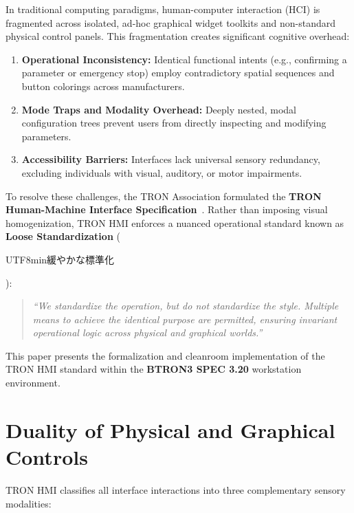 \documentclass[10pt,journal,compsoc,twocolumn]{article}
\newcommand{\ja}[1]{\begin{CJK*}{UTF8}{min}#1\end{CJK*}}
\begin{document}
In traditional computing paradigms, human-computer interaction (HCI) is fragmented across isolated, ad-hoc graphical widget toolkits and non-standard physical control panels. This fragmentation creates significant cognitive overhead:
\begin{enumerate}[leftmargin=*]
    \item \textbf{Operational Inconsistency:} Identical functional intents (e.g., confirming a parameter or emergency stop) employ contradictory spatial sequences and button colorings across manufacturers.
    \item \textbf{Mode Traps and Modality Overhead:} Deeply nested, modal configuration trees prevent users from directly inspecting and modifying parameters.
    \item \textbf{Accessibility Barriers:} Interfaces lack universal sensory redundancy, excluding individuals with visual, auditory, or motor impairments.
\end{enumerate}

To resolve these challenges, the TRON Association formulated the \textbf{TRON Human-Machine Interface Specification}~\cite{sakamura1993hmi}. Rather than imposing visual homogenization, TRON HMI enforces a nuanced operational standard known as \textbf{Loose Standardization} (\ja{緩やかな標準化}):

\begin{quote}
\itshape
``We standardize the operation, but do not standardize the style. Multiple means to achieve the identical purpose are permitted, ensuring invariant operational logic across physical and graphical worlds.''
\end{quote}

This paper presents the formalization and cleanroom implementation of the TRON HMI standard within the \textbf{BTRON3 SPEC 3.20} workstation environment.

\section{Duality of Physical and Graphical Controls}
\label{sec:duality}

TRON HMI classifies all interface interactions into three complementary sensory modalities:
\end{document}
